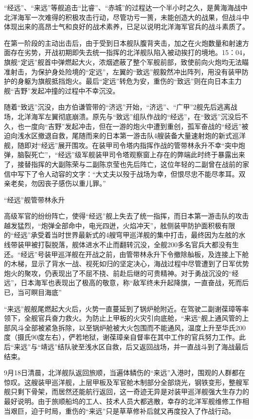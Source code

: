 \documentclass[12pt,UTF8]{ctexbook}
\begin{document}
“经远”、“来远”等舰追击“比睿”、“赤城”的过程达一个半小时之久，是黄海海战中北洋海军一次难得的积极攻击行动，尽管功亏一篑，未能创造大的战果，但战斗中体现出来的高昂士气和良好的战术素养，已足以说明北洋海军官兵的战斗素质了。

在第一阶段的主动出击后，由于受到日本舰队腹背夹击，加之在火炮数量和射速方面存在劣势，开战初期即失去统一指挥的北洋舰队陷入被动挨打的境地。15：04，旗舰“定远”舰首中弹燃起大火，浓烟遮蔽了整个军舰前部，致使前向火炮均无法瞄准射击，为保护身处险境的“定远”，左翼的“致远”舰毅然冲出阵列，用没有装甲防护的身躯为旗舰抵挡炮火。最后“定远”转危为安，重伤的“致远”则在向日本主力舰“吉野”发起冲撞的过程中不幸沉没。

随着“致远”沉没，由方伯谦管带的“济远”开始，“济远”、“广甲”2舰先后逃离战场，北洋海军左翼彻底崩溃。原先与“致远”组队作战的“经远”，在“致远”沉没后不久，也一度向“吉野”发起冲击，但在一游的炮火中遭到重创，孤军奋战的“经远”被迫向浅水区撤退自救，尾随而来的日本第一游击队4艘装备大量速射炮的新式巡洋舰，随即对“经远”展开围攻。在装甲司令塔内指挥作战的管带林永升不幸“突中炮弹，脑裂死亡”，“经远”级军舰装甲司令塔观察窗上存在的弊端此时终于暴露出来了，接替指挥的大副陈荣与二副陈京莹也先后阵亡，这位年轻的二副曾在战前的家信中写下了令人动容的文字：“大丈夫以殁于战场为幸，但恨尽忠不能尽孝耳。双亲老矣，勿因丧子感伤以重儿罪。”

“经远”舰管带林永升

高级军官的纷纷阵亡，使得“经远”舰上失去了统一指挥，而日本第一游击队的攻击越发猛烈，“炮弹全部命中，电光四迸，火焰冲天”，舷侧装甲防护面积极有限的“经远”承受着当时世界最新式的4艘穹甲巡洋舰的集中打击，最终因为左舷的水线带装甲被打裂脱落，舰体进水不止而翻转沉没，全舰200多名官兵大都没有生还。“经远”号装甲巡洋舰在开战之前，由管带林永升下令撤除舢板，及连接上下舱的木梯，显示了背水一战、视死如归的坚定决心，海战过程中尽管遭到了日军优势炮火的聚攻，仍表现出了不屈不挠、前赴后继的可贵精神。对于勇战沉没的“经远”，日本海军也表现出了极高的敬意，称“敌军终未升起降旗，一直奋战，死而后已，当可瞑目海底”

“来远”舰舰尾燃起大火后，火势一直蔓延到了锅炉舱附近。在驾驶二副谢葆璋等率领下，全舰官兵奋力救火。为防止上甲板的火灾引向底舱，“来远“舰上通风管的上部风斗全部被紧急拆除，以至锅炉舱被大火包围而不能通风，温度上升至华氏200度（摄氏90度左右），俨若地狱，谢葆璋亲自督率在其中工作的官兵努力工作。此后“来远”与“靖远”结队驶至浅水区自救，后又返回战场，并一直战斗到了海战最后结束。

9月18日清晨，北洋舰队返回旅顺，当遍体鳞伤的“来远”入港时，围观的人群都在惊叹。这艘装甲巡洋舰，上层甲板及军官舱木制部分全部烧光，钢铁变形，整艘军舰只剩下骨架，而居然还能航行返回，这一奇迹无异是对装甲巡洋舰强大生存力的最好说明。由于旅顺船坞的工人、技术人员大都逃散，幸存的北洋军舰维修工作相当艰巨，迫于时局，重伤的“来远”只是草草修补后就又再度投入了作战行动。
\end{document}
